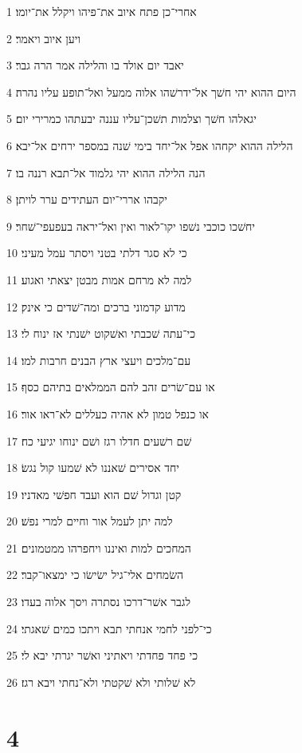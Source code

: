 \par 1 אחרי־כן פתח איוב את־פיהו ויקלל את־יומו׃
\par 2 ויען איוב ויאמר׃
\par 3 יאבד יום אולד בו והלילה אמר הרה גבר׃
\par 4 היום ההוא יהי חשׁך אל־ידרשׁהו אלוה ממעל ואל־תופע עליו נהרה׃
\par 5 יגאלהו חשׁך וצלמות תשׁכן־עליו עננה יבעתהו כמרירי יום׃
\par 6 הלילה ההוא יקחהו אפל אל־יחד בימי שׁנה במספר ירחים אל־יבא׃
\par 7 הנה הלילה ההוא יהי גלמוד אל־תבא רננה בו׃
\par 8 יקבהו אררי־יום העתידים ערר לויתן׃
\par 9 יחשׁכו כוכבי נשׁפו יקו־לאור ואין ואל־יראה בעפעפי־שׁחר׃
\par 10 כי לא סגר דלתי בטני ויסתר עמל מעיני׃
\par 11 למה לא מרחם אמות מבטן יצאתי ואגוע׃
\par 12 מדוע קדמוני ברכים ומה־שׁדים כי אינק׃
\par 13 כי־עתה שׁכבתי ואשׁקוט ישׁנתי אז ינוח לי׃
\par 14 עם־מלכים ויעצי ארץ הבנים חרבות למו׃
\par 15 או עם־שׂרים זהב להם הממלאים בתיהם כסף׃
\par 16 או כנפל טמון לא אהיה כעללים לא־ראו אור׃
\par 17 שׁם רשׁעים חדלו רגז ושׁם ינוחו יגיעי כח׃
\par 18 יחד אסירים שׁאננו לא שׁמעו קול נגשׂ׃
\par 19 קטן וגדול שׁם הוא ועבד חפשׁי מאדניו׃
\par 20 למה יתן לעמל אור וחיים למרי נפשׁ׃
\par 21 המחכים למות ואיננו ויחפרהו ממטמונים׃
\par 22 השׂמחים אלי־גיל ישׂישׂו כי ימצאו־קבר׃
\par 23 לגבר אשׁר־דרכו נסתרה ויסך אלוה בעדו׃
\par 24 כי־לפני לחמי אנחתי תבא ויתכו כמים שׁאגתי׃
\par 25 כי פחד פחדתי ויאתיני ואשׁר יגרתי יבא לי׃
\par 26 לא שׁלותי ולא שׁקטתי ולא־נחתי ויבא רגז׃

\chapter{4}

